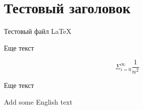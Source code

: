 \documentclass{article}
\begin{document}
\section{Тестовый заголовок}

Тестовый файл \LaTeX

Еще текст

\[
\Sigma_{i=0}^\infty \frac{1}{n^2}
\]

Еще текст


Add some English text
\end{document}
